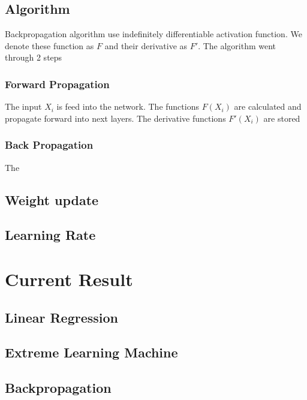 \documentclass{article}
\begin{document}
\subsection{Algorithm}
Backpropagation algorithm use indefinitely differentiable activation function. We denote these function as $F$ and their derivative as $F'$. The algorithm went through 2 steps
\subsubsection{Forward Propagation}
The input $X_i$ is feed into the network. The functions $F(X_i)$ are calculated and propagate forward into next layers. The derivative functions $F'(X_i)$ are stored
\subsubsection{Back Propagation}
The 
\nocite{rojas_neural_1996}
\subsection{Weight update}
\subsection{Learning Rate}
\pagebreak

\section{Current Result}
\subsection{Linear Regression}
\subsection{Extreme Learning Machine}
\subsection{Backpropagation}



\end{document}
